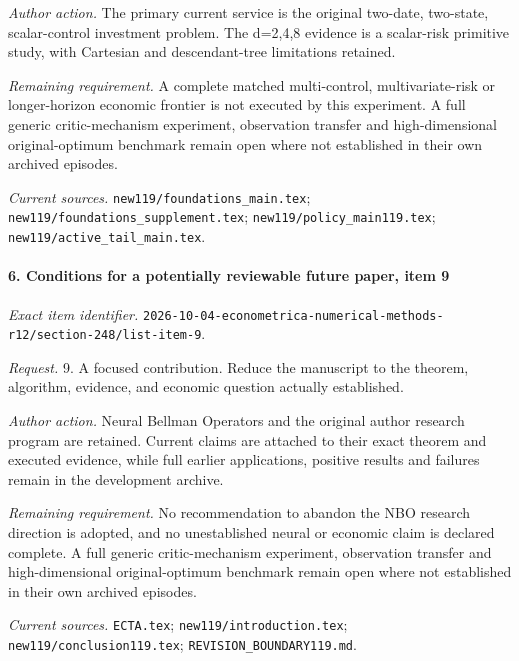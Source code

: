 \par\emph{Author action.} The primary current service is the original two-date, two-state, scalar-control investment problem. The d=2,4,8 evidence is a scalar-risk primitive study, with Cartesian and descendant-tree limitations retained.

\par\emph{Remaining requirement.} A complete matched multi-control, multivariate-risk or longer-horizon economic frontier is not executed by this experiment. A full generic critic-mechanism experiment, observation transfer and high-dimensional original-optimum benchmark remain open where not established in their own archived episodes.

\par\emph{Current sources.} \nolinkurl{new119/foundations_main.tex}; \nolinkurl{new119/foundations_supplement.tex}; \nolinkurl{new119/policy_main119.tex}; \nolinkurl{new119/active_tail_main.tex}.

\paragraph{6. Conditions for a potentially reviewable future paper, item 9}

\emph{Exact item identifier.} \nolinkurl{2026-10-04-econometrica-numerical-methods-r12/section-248/list-item-9}.

\par\emph{Request.} 9. A focused contribution. Reduce the manuscript to the theorem, algorithm, evidence, and economic question actually established.

\par\emph{Author action.} Neural Bellman Operators and the original author research program are retained. Current claims are attached to their exact theorem and executed evidence, while full earlier applications, positive results and failures remain in the development archive.

\par\emph{Remaining requirement.} No recommendation to abandon the NBO research direction is adopted, and no unestablished neural or economic claim is declared complete. A full generic critic-mechanism experiment, observation transfer and high-dimensional original-optimum benchmark remain open where not established in their own archived episodes.

\par\emph{Current sources.} \nolinkurl{ECTA.tex}; \nolinkurl{new119/introduction.tex}; \nolinkurl{new119/conclusion119.tex}; \nolinkurl{REVISION_BOUNDARY119.md}.

